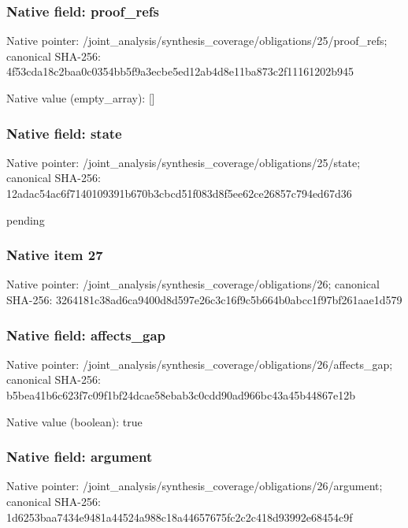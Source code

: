 \documentclass[10pt,a4paper]{article}
\begin{document}
\subsubsection{Native field: proof\_\allowbreak{}refs}
Native pointer: /joint\_\allowbreak{}analysis/synthesis\_\allowbreak{}coverage/obligations/25/proof\_\allowbreak{}refs; canonical SHA-256: 4f53cda18c2baa0c0354bb5f9a3ecbe5ed12ab4d8e11ba873c2f11161202b945

Native value (empty\_\allowbreak{}array): []

\subsubsection{Native field: state}
Native pointer: /joint\_\allowbreak{}analysis/synthesis\_\allowbreak{}coverage/obligations/25/state; canonical SHA-256: 12adac54ac6f7140109391b670b3cbcd51f083d8f5ee62ce26857c794ed67d36

\begingroup\raggedright\sloppy pending\par\endgroup

\subsubsection{Native item 27}
Native pointer: /joint\_\allowbreak{}analysis/synthesis\_\allowbreak{}coverage/obligations/26; canonical SHA-256: 3264181c38ad6ca9400d8d597e26c3c16f9c5b664b0abcc1f97bf261aae1d579

\subsubsection{Native field: affects\_\allowbreak{}gap}
Native pointer: /joint\_\allowbreak{}analysis/synthesis\_\allowbreak{}coverage/obligations/26/affects\_\allowbreak{}gap; canonical SHA-256: b5bea41b6c623f7c09f1bf24dcae58ebab3c0cdd90ad966bc43a45b44867e12b

Native value (boolean): true

\subsubsection{Native field: argument}
Native pointer: /joint\_\allowbreak{}analysis/synthesis\_\allowbreak{}coverage/obligations/26/argument; canonical SHA-256: 1d6253baa7434e9481a44524a988c18a44657675fc2c2c418d93992e68454c9f
\end{document}

